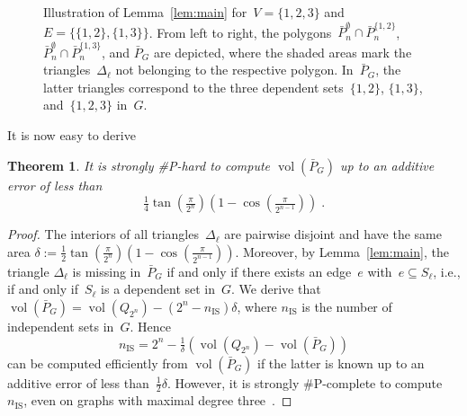 \documentclass{article}
\newtheorem{theorem}{Theorem}
\newcommand{\card}{\#}
\DeclareMathOperator{\vol}{vol}
\begin{document}
\begin{figure}
\begin{center}
  \end{center}
  \caption{Illustration of Lemma~\ref{lem:main} for~$V=\{1,2,3\}$
    and $E=\{\{1,2\},\{1,3\}\}$. From left to right, the
    polygons~$\bar P_n^\emptyset\cap\bar P_n^{\{1,2\}}$, $\bar
    P_n^\emptyset\cap\bar P_n^{\{1,3\}}$, and $\bar P_G$ are depicted,
    where the shaded areas mark the triangles~$\Delta_\ell$ not
    belonging to the respective polygon. In~$\bar P_G$, the latter
    triangles correspond to the three dependent sets~$\{1,2\}$,
    $\{1,3\}$, and~$\{1,2,3\}$ in~$G$.}\label{fig:main}
\end{figure}
It is now easy to derive
\begin{theorem}\label{theo:vol}
  It is strongly \card P-hard to compute $\vol(\bar P_G)$ up to an
  additive error of less than
  $$\tfrac 14\tan(\tfrac\pi{2^n})(1-\cos(\tfrac\pi{2^{n-1}}))\;.$$
\end{theorem}
\begin{proof}
  The interiors of all triangles~$\Delta_\ell$ are pairwise disjoint
  and have the same area $\delta:=\tfrac
  12\tan(\tfrac\pi{2^n})(1-\cos(\tfrac\pi{2^{n-1}}))$. Moreover, by
  Lemma~\ref{lem:main}, the triangle $\Delta_\ell$ is missing
  in~$\bar P_G$ if and only if there exists an edge~$e$
  with~$e\subseteq S_\ell$, i.e., if and only if~$S_\ell$ is a
  dependent set in~$G$. We derive that $\vol(\bar
  P_G)=\vol(Q_{2^{n}})-(2^n-n_{\text{IS}})\delta$, where
  $n_{\text{IS}}$ is the number of independent sets in~$G$. Hence
  \[
  n_{\text{IS}}=2^n-\tfrac 1\delta(\vol(Q_{2^n})-\vol(\bar P_G))
  \]
  can be computed efficiently from $\vol(\bar P_G)$ if the latter is
  known up to an additive error of less than~$\tfrac
  12\delta$. However, it is strongly \card P-complete to
  compute~$n_{\text{IS}}$, even on graphs with maximal degree
  three~\cite[Theorem~4.2]{Dyer00}.
\end{proof}
\end{document}
